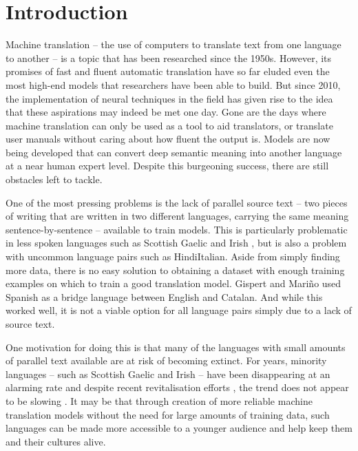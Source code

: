 \documentclass[11pt]{article}
\begin{document}
\section{Introduction}

Machine translation -- the use of computers to translate text from one language to another -- is a topic that has been researched since the 1950s. However, its promises of fast and fluent automatic translation have so far eluded even the most high-end models that researchers have been able to build. But since 2010, the implementation of neural techniques in the field has given rise to the idea that these aspirations may indeed be met one day. Gone are the days where machine translation can only be used as a tool to aid translators, or translate user manuals without caring about how fluent the output is. Models are now being developed that can convert deep semantic meaning into another language at a near human expert level. Despite this burgeoning success, there are still obstacles left to tackle.

\bigskip

One of the most pressing problems is the lack of parallel source text -- two pieces of writing that are written in two different languages, carrying the same meaning sentence-by-sentence -- available to train models. This is particularly problematic in less spoken languages such as Scottish Gaelic and Irish \citep{gaelic}, but is also a problem with uncommon language pairs such as Hindi\textendash Italian. Aside from simply finding more data, there is no easy solution to obtaining a dataset with enough training examples on which to train a good translation model. Gispert and Mariño \citeyearpar{catalan} used Spanish as a bridge language between English and Catalan. And while this worked well, it is not a viable option for all language pairs simply due to a lack of source text. 

\bigskip

One motivation for doing this is that many of the languages with small amounts of parallel text available are at risk of becoming extinct. For years, minority languages -- such as Scottish Gaelic and Irish -- have been disappearing at an alarming rate \citep{ostler1999disappearing} and despite recent revitalisation efforts \citep{gaelic-language-plan, irish-language-plan}, the trend does not appear to be slowing \citep{thomason2015endangered}. It may be that through creation of more reliable machine translation models without the need for large amounts of training data, such languages can be made more accessible to a younger audience and help keep them and their cultures alive.
\end{document}
